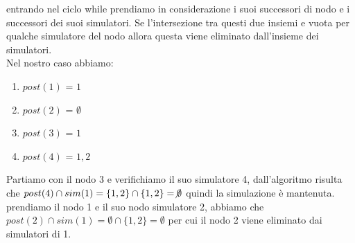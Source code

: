 entrando nel ciclo while prendiamo in considerazione i suoi successori di nodo e i successori dei suoi simulatori. Se l'intersezione tra questi due insiemi e vuota per qualche simulatore del nodo allora questa viene eliminato dall'insieme dei simulatori.\\
Nel nostro caso abbiamo:
\begin{enumerate}
\item $post(1)$ = ${1}$
\item $post(2)$ = $\emptyset$
\item $post(3)$ = ${1}$
\item $post(4)$ = ${1,2}$
\end{enumerate}
Partiamo con il nodo 3 e verifichiamo il suo simulatore 4, dall'algoritmo risulta che $post(4)\cap sim(1) = \{1,2\} \cap \{1,2\} = \not\emptyset$ quindi la simulazione è mantenuta.\\
prendiamo il nodo 1 e il suo nodo simulatore 2, abbiamo che $post(2)\cap sim(1) = \emptyset\cap \{1,2\} = \emptyset$ per cui il nodo 2 viene eliminato dai simulatori di 1.
